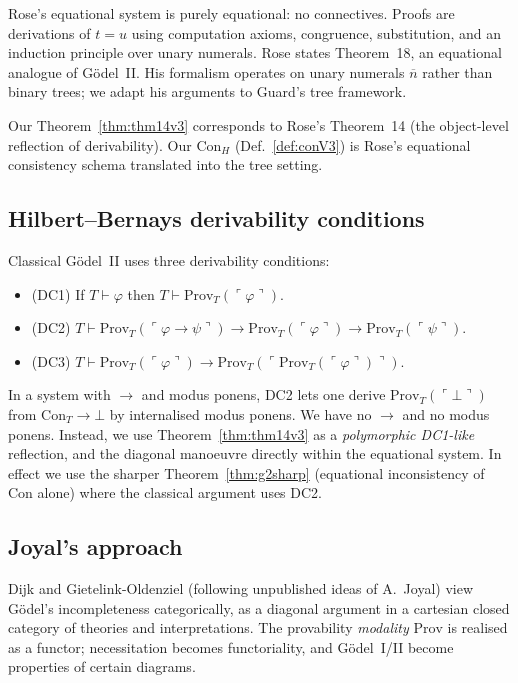 \documentclass[11pt]{article}
\newcommand{\nat}[1]{\overline{#1}}
\newcommand{\code}[1]{\ulcorner #1 \urcorner}
\begin{document}
Rose's equational system is purely equational: no connectives.  Proofs
are derivations of $t = u$ using computation axioms, congruence,
substitution, and an induction principle over unary numerals.  Rose
states Theorem~18, an equational analogue of G\"odel~II.  His
formalism operates on unary numerals $\nat{n}$ rather than binary
trees; we adapt his arguments to Guard's tree framework.

Our Theorem~\ref{thm:thm14v3} corresponds to Rose's Theorem~14 (the
object-level reflection of derivability).  Our $\mathrm{Con}_H$
(Def.~\ref{def:conV3}) is Rose's equational consistency schema
translated into the tree setting.

\subsection{Hilbert--Bernays derivability conditions}

Classical G\"odel~II uses three derivability conditions:
\begin{itemize}
\item (DC1) If $T \vdash \varphi$ then $T \vdash \mathrm{Prov}_T(\code{\varphi})$.
\item (DC2) $T \vdash \mathrm{Prov}_T(\code{\varphi \to \psi}) \to
          \mathrm{Prov}_T(\code{\varphi}) \to \mathrm{Prov}_T(\code{\psi})$.
\item (DC3) $T \vdash \mathrm{Prov}_T(\code{\varphi}) \to
          \mathrm{Prov}_T(\code{\mathrm{Prov}_T(\code{\varphi})})$.
\end{itemize}
In a system with $\to$ and modus ponens, DC2 lets one derive
$\mathrm{Prov}_T(\code{\bot})$ from $\mathrm{Con}_T \to \bot$ by
internalised modus ponens.  We have no $\to$ and no modus ponens.
Instead, we use Theorem~\ref{thm:thm14v3} as a \emph{polymorphic
DC1-like} reflection, and the diagonal manoeuvre directly within
the equational system.  In effect we use the sharper
Theorem~\ref{thm:g2sharp} (equational inconsistency of
$\mathrm{Con}$ alone) where the classical argument uses DC2.

\subsection{Joyal's approach~\cite{dijk2020goedel}}

Dijk and Gietelink-Oldenziel (following unpublished ideas of
A.~Joyal) view G\"odel's incompleteness categorically, as a
diagonal argument in a cartesian closed category of theories and
interpretations.  The provability \emph{modality} $\mathrm{Prov}$
is realised as a functor; necessitation becomes functoriality, and
G\"odel~I/II become properties of certain diagrams.
\end{document}
